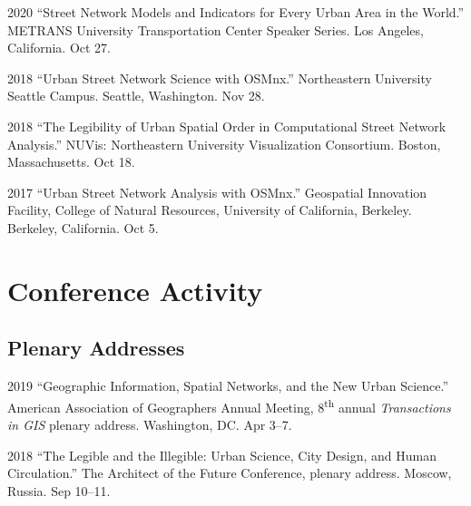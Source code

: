 \documentclass[12pt,letterpaper]{report}
\begin{document}
    \begin{tablist}

        \item[2020] \tab \enquote{Street Network Models and Indicators for Every Urban Area in the World.} METRANS University Transportation Center Speaker Series. Los Angeles, California. Oct 27.

        \item[2018] \tab \enquote{Urban Street Network Science with OSMnx.} Northeastern University Seattle Campus. Seattle, Washington. Nov 28.

        \item[2018] \tab \enquote{The Legibility of Urban Spatial Order in Computational Street Network Analysis.} NUVis: Northeastern University Visualization Consortium. Boston, Massachusetts. Oct 18.

        \item[2017] \tab \enquote{Urban Street Network Analysis with OSMnx.} Geospatial Innovation Facility, College of Natural Resources, University of California, Berkeley. Berkeley, California. Oct 5.

    \end{tablist}



    \section*{Conference Activity}

    \subsection*{Plenary Addresses}

    \begin{tablist}

        \item[2019] \tab \enquote{Geographic Information, Spatial Networks, and the New Urban Science.} American Association of Geographers Annual Meeting, 8\textsuperscript{th} annual \textit{Transactions in GIS} plenary address. Washington, DC. Apr 3--7.

        \item[2018] \tab \enquote{The Legible and the Illegible: Urban Science, City Design, and Human Circulation.} The Architect of the Future Conference, plenary address. Moscow, Russia. Sep 10--11.

    \end{tablist}
\end{document}
